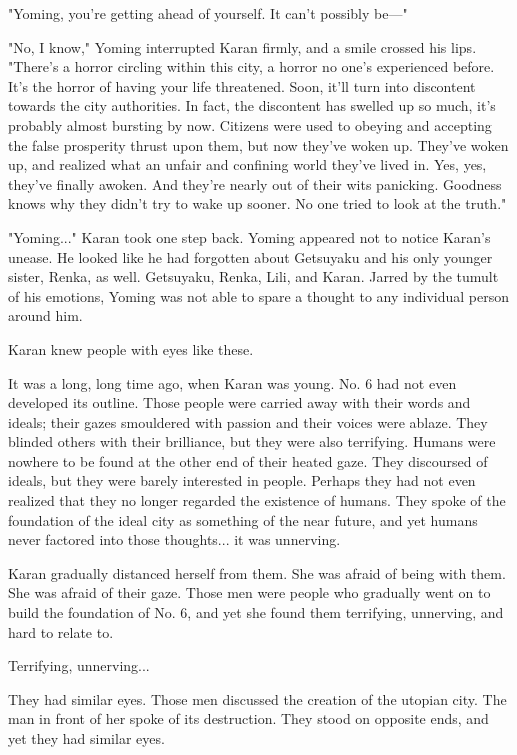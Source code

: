 "Yoming, you're getting ahead of yourself. It can't possibly be---"

"No, I know," Yoming interrupted Karan firmly, and a smile crossed his
lips. "There's a horror circling within this city, a horror no one's
experienced before. It's the horror of having your life threatened.
Soon, it'll turn into discontent towards the city authorities. In fact,
the discontent has swelled up so much, it's probably almost bursting by
now. Citizens were used to obeying and accepting the false prosperity
thrust upon them, but now they've woken up. They've woken up, and
realized what an unfair and confining world they've lived in. Yes, yes,
they've finally awoken. And they're nearly out of their wits panicking.
Goodness knows why they didn't try to wake up sooner. No one tried to
look at the truth."

"Yoming..." Karan took one step back. Yoming appeared not to notice
Karan's unease. He looked like he had forgotten about Getsuyaku and his
only younger sister, Renka, as well. Getsuyaku, Renka, Lili, and Karan.
Jarred by the tumult of his emotions, Yoming was not able to spare a
thought to any individual person around him.

Karan knew people with eyes like these.

It was a long, long time ago, when Karan was young. No. 6 had not even
developed its outline. Those people were carried away with their words
and ideals; their gazes smouldered with passion and their voices were
ablaze. They blinded others with their brilliance, but they were also
terrifying. Humans were nowhere to be found at the other end of their
heated gaze. They discoursed of ideals, but they were barely interested
in people. Perhaps they had not even realized that they no longer
regarded the existence of humans. They spoke of the foundation of the
ideal city as something of the near future, and yet humans never
factored into those thoughts... it was unnerving.

Karan gradually distanced herself from them. She was afraid of being
with them. She was afraid of their gaze. Those men were people who
gradually went on to build the foundation of No. 6, and yet she found
them terrifying, unnerving, and hard to relate to.

Terrifying, unnerving...

They had similar eyes. Those men discussed the creation of the utopian
city. The man in front of her spoke of its destruction. They stood on
opposite ends, and yet they had similar eyes.

